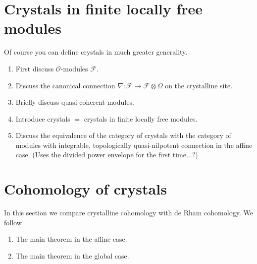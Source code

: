 \section{Crystals in finite locally free modules}
\label{section-crystals}

\noindent
Of course you can define crystals in much greater generality.

\begin{enumerate}
\item First discuss $\mathcal{O}$-modules $\mathcal{F}$.
\item Discuss the canonical connection
$\nabla : \mathcal{F} \to \mathcal{F} \otimes \Omega$
on the crystalline site.
\item Briefly discuss quasi-coherent modules.
\item Introduce crystals $=$ crystals in finite locally free modules.
\item Discuss the equivalence of the category of crystals with the
category of modules with integrable, topologically quasi-nilpotent
connection in the affine case. (Uses the divided power envelope for the
first time...?)
\end{enumerate}






\section{Cohomology of crystals}
\label{section-cohomology}

\noindent
In this section we compare crystalline cohomology with de Rham
cohomology. We follow \cite{Bhatt}.

\begin{enumerate}
\item The main theorem in the affine case.
\item The main theorem in the global case.
\end{enumerate}













